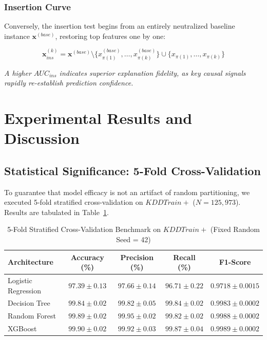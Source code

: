\documentclass[conference]{IEEEtran}
\begin{document}
\subsubsection{Insertion Curve}

Conversely, the insertion test begins from an entirely neutralized baseline instance $\mathbf{x}^{(base)}$, restoring top features one by one:

\begin{equation}
\mathbf{x}^{(k)}_{ins} = \mathbf{x}^{(base)} \setminus \{x^{(base)}_{\pi(1)}, \dots, x^{(base)}_{\pi(k)}\} \cup \{x_{\pi(1)}, \dots, x_{\pi(k)}\}
\end{equation}

\textit{A higher $AUC_{ins}$ indicates superior explanation fidelity, as key causal signals rapidly re-establish prediction confidence.}

\section{Experimental Results and Discussion}

\subsection{Statistical Significance: 5-Fold Cross-Validation}

To guarantee that model efficacy is not an artifact of random partitioning, we executed 5-fold stratified cross-validation on $KDDTrain+$ ($N=125,973$). Results are tabulated in Table~\ref{tab:cv_results}.

\begin{table}[h]
\caption{5-Fold Stratified Cross-Validation Benchmark on $KDDTrain+$ (Fixed Random Seed = 42)}
\label{tab:cv_results}
\centering
\begin{tabular}{lcccc}
\toprule
\textbf{Architecture} & \textbf{Accuracy (\%)} & \textbf{Precision (\%)} & \textbf{Recall (\%)} & \textbf{F1-Score} \\
\midrule
Logistic Regression & $97.39 \pm 0.13$ & $97.66 \pm 0.14$ & $96.71 \pm 0.22$ & $0.9718 \pm 0.0015$ \\
Decision Tree & $99.84 \pm 0.02$ & $99.82 \pm 0.05$ & $99.84 \pm 0.02$ & $0.9983 \pm 0.0002$ \\
Random Forest & $\mathbf{99.89 \pm 0.02}$ & $\mathbf{99.95 \pm 0.02}$ & $\mathbf{99.82 \pm 0.02}$ & $\mathbf{0.9988 \pm 0.0002}$ \\
XGBoost & $\mathbf{99.90 \pm 0.02}$ & $\mathbf{99.92 \pm 0.03}$ & $\mathbf{99.87 \pm 0.04}$ & $\mathbf{0.9989 \pm 0.0002}$ \\
\bottomrule
\end{tabular}
\end{table}
\end{document}

